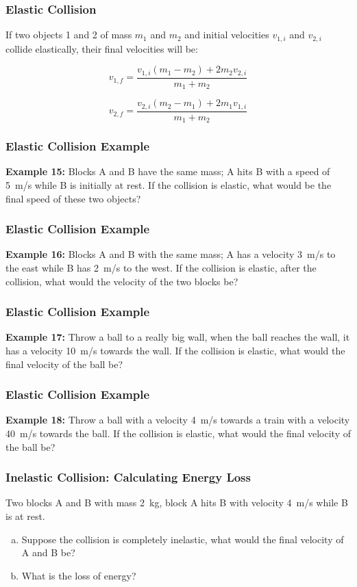 \documentclass[12pt,compress,aspectratio=169]{beamer}
\begin{document}
\begin{frame}
  \frametitle{Elastic Collision}
  If two objects 1 and 2 of mass $m_1$ and $m_2$ and initial velocities
  $v_{1,i}$ and $v_{2,i}$ collide elastically, their final velocities will be:
  
  {\Large
    \begin{displaymath}
      v_{1,f}=\frac{v_{1,i}(m_1-m_2)+2m_2v_{2,i}}{m_1+m_2}
    \end{displaymath}
    
    \begin{displaymath}
      v_{2,f}=\frac{v_{2,i}(m_2-m_1)+2m_1v_{1,i}}{m_1+m_2}
    \end{displaymath}
  }
\end{frame}

\begin{frame}
  \frametitle{Elastic Collision Example}

  \textbf{Example 15:} Blocks A and B have the same mass; A hits B with a speed
  of \SI{5}{m/s} while B is initially at rest. If the collision is elastic,
  what would be the final speed of these two objects?
\end{frame}


\begin{frame}
  \frametitle{Elastic Collision Example}
  \textbf{Example 16:} Blocks A and B with the same mass; A has a velocity
  \SI{3}{m/s} to the east while B has \SI{2}{m/s} to the west. If the collision
  is elastic, after the collision, what would the velocity of the two blocks be?
\end{frame}


\begin{frame}
  \frametitle{Elastic Collision Example}
  
  \textbf{Example 17:} Throw a ball to a really big wall, when the ball reaches
  the wall, it has a velocity \SI{10}{m/s} towards the wall. If the collision
  is elastic, what would the final velocity of the ball be?
\end{frame}


\begin{frame}
  \frametitle{Elastic Collision Example}
  \textbf{Example 18:} Throw a ball with a velocity \SI{4}{m/s} towards a train
  with a velocity \SI{40}{m/s} towards the ball. If the collision is elastic,
  what would the final velocity of the ball be?
\end{frame}


\begin{frame}
  \frametitle{Inelastic Collision: Calculating Energy Loss}
  Two blocks A and B with mass \SI{2}{kg}, block A hits B with velocity
  \SI{4}{m/s} while B is at rest.
  \begin{enumerate}[(a)]
  \item Suppose the collision is completely inelastic, what would the final
    velocity of A and B be?
  \item What is the loss of energy?
  \end{enumerate}
\end{frame}
\end{document}
